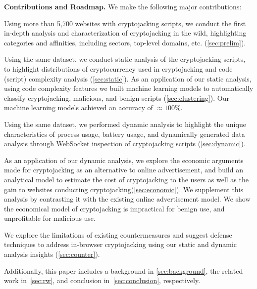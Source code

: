 \documentclass[acmlarge]{acmart}
\newcommand{\BfPara}[1]{{\noindent\bf#1.}\xspace\xspace}
\newcommand{\cc}{{cryptocurrency}\xspace}
\newcommand{\cj}{cryptojacking\xspace}
\begin{document}
\BfPara{Contributions and Roadmap}
We make the following major contributions:
\begin{enumerate*}
    \item Using more than 5,700 websites with \cj scripts, we conduct the first in-depth analysis and characterization of \cj in the wild, highlighting categories and affinities, including sectors, top-level domains, etc. (\textsection\ref{sec:prelim}). 
    \item Using the same dataset, we conduct static analysis of the \cj scripts, to highlight distributions of \cc used in \cj and code (script) complexity analysis (\textsection\ref{sec:static}). As an application of our static analysis, using code complexity features we built machine learning models to automatically classify \cj, malicious, and benign scripts (\textsection\ref{sec:clustering}). Our machine learning models achieved an accuracy of $\approx100\%$. 
    \item Using the same dataset, we performed dynamic analysis to highlight the unique characteristics of process usage, battery usage, and dynamically generated data analysis through WebSocket inspection of \cj scripts (\textsection\ref{sec:dynamic}). 
    \item As an application of our dynamic analysis, we explore the economic arguments made for \cj as an alternative to online advertisement, and build an analytical model to estimate the cost of \cj to the users as well as the gain to websites conducting \cj (\textsection\ref{sec:economic}). We supplement this analysis by contrasting it with the existing online advertisement model. We show the economical model of \cj is impractical for benign use, and unprofitable for malicious use. 
    \item We explore the limitations of existing countermeasures and suggest defense techniques to address in-browser \cj using our static and dynamic analysis insights (\textsection\ref{sec:counter}). 
\end{enumerate*}

Additionally, this paper includes a background in \textsection\ref{sec:background}, the related work in~\textsection\ref{sec:rw}, and conclusion in~\textsection\ref{sec:conclusion}, respectively. 

\end{document}
